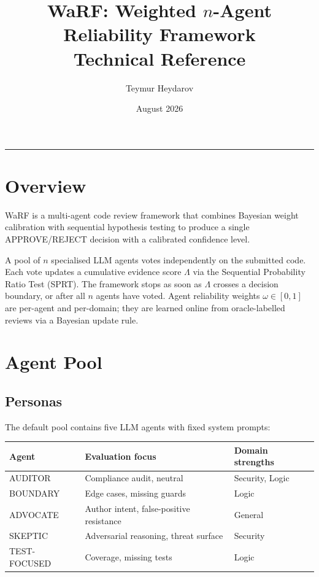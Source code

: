 \documentclass[11pt,a4paper]{article}
\title{\textbf{WaRF: Weighted $n$-Agent Reliability Framework}\\[0.4em]
\large Technical Reference}
\author{Teymur Heydarov}
\date{August 2026}
\begin{document}
\maketitle
\tableofcontents
\bigskip\hrule
\bigskip

\section{Overview}

WaRF is a multi-agent code review framework that combines Bayesian weight
calibration with sequential hypothesis testing to produce a single
APPROVE/REJECT decision with a calibrated confidence level.

A pool of $n$ specialised LLM agents votes independently on the submitted
code. Each vote updates a cumulative evidence score $\Lambda$ via the
Sequential Probability Ratio Test (SPRT). The framework stops as soon as
$\Lambda$ crosses a decision boundary, or after all $n$ agents have voted.
Agent reliability weights $\omega \in [0,1]$ are per-agent and per-domain;
they are learned online from oracle-labelled reviews via a Bayesian update
rule.

\section{Agent Pool}

\subsection{Personas}

The default pool contains five LLM agents with fixed system prompts:

\begin{center}
\begin{tabular}{lll}
\toprule
Agent & Evaluation focus & Domain strengths \\
\midrule
AUDITOR      & Compliance audit, neutral         & Security, Logic \\
BOUNDARY     & Edge cases, missing guards        & Logic \\
ADVOCATE     & Author intent, false-positive resistance & General \\
SKEPTIC      & Adversarial reasoning, threat surface & Security \\
TEST-FOCUSED & Coverage, missing tests           & Logic \\
\bottomrule
\end{tabular}
\end{center}
\end{document}
